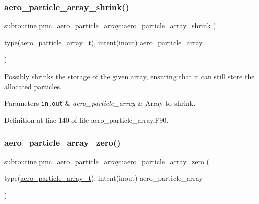 \subsubsection{\texorpdfstring{aero\+\_\+particle\+\_\+array\+\_\+shrink()}{aero\_particle\_array\_shrink()}}
{\footnotesize\ttfamily subroutine pmc\+\_\+aero\+\_\+particle\+\_\+array\+::aero\+\_\+particle\+\_\+array\+\_\+shrink (\begin{DoxyParamCaption}\item[{type(\mbox{\hyperlink{structpmc__aero__particle__array_1_1aero__particle__array__t}{aero\+\_\+particle\+\_\+array\+\_\+t}}), intent(inout)}]{aero\+\_\+particle\+\_\+array }\end{DoxyParamCaption})}



Possibly shrinks the storage of the given array, ensuring that it can still store the allocated particles. 


\begin{DoxyParams}[1]{Parameters}
\mbox{\tt in,out}  & {\em aero\+\_\+particle\+\_\+array} & Array to shrink. \\
\hline
\end{DoxyParams}


Definition at line 140 of file aero\+\_\+particle\+\_\+array.\+F90.

\mbox{\label{namespacepmc__aero__particle__array_aba7d47622753636d93746a4cbe3c0222}} 
\subsubsection{\texorpdfstring{aero\+\_\+particle\+\_\+array\+\_\+zero()}{aero\_particle\_array\_zero()}}
{\footnotesize\ttfamily subroutine pmc\+\_\+aero\+\_\+particle\+\_\+array\+::aero\+\_\+particle\+\_\+array\+\_\+zero (\begin{DoxyParamCaption}\item[{type(\mbox{\hyperlink{structpmc__aero__particle__array_1_1aero__particle__array__t}{aero\+\_\+particle\+\_\+array\+\_\+t}}), intent(inout)}]{aero\+\_\+particle\+\_\+array }\end{DoxyParamCaption})}



